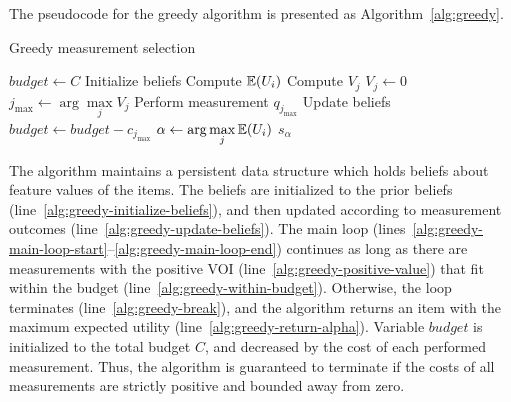 The pseudocode for the greedy algorithm is presented as Algorithm~\ref{alg:greedy}. 
\begin{algorithm}[t]
\caption{Greedy measurement selection}
\label{alg:greedy}
\begin{algorithmic}[1]
\State $budget \leftarrow C$
\State Initialize beliefs                             \label{alg:greedy-initialize-beliefs}
\Loop                                                 \label{alg:greedy-main-loop-start}
    \State Compute $\mathbb{E}(U_i)$
  \EndFor
                          \label{alg:greedy-voi-start}
                                \label{alg:greedy-within-budget}
      \State Compute $V_j$                            \label{alg:compute-voi}
    \Else
      \State $V_j \leftarrow 0$
    \EndIf
  \EndFor                                            \label{alg:greedy-voi-end}
  \State $j_{\max} \leftarrow \arg \max\limits_j V_j$  \label{alg:greedy-select}
                                  \label{alg:greedy-positive-value}
    \State Perform measurement $q_{j_{\max}}$           \label{alg:greedy-measure}
    \State Update beliefs                            \label{alg:greedy-update-beliefs}
    \State $budget \leftarrow  budget-c_{j_{\max}}$
  \EndIf
                                \label{alg:greedy-break}
\EndLoop                                            \label{alg:greedy-main-loop-end}
\State $\alpha \leftarrow \arg \max \limits_j \mathbb{E}(U_i)$
\Return $s_\alpha$                                   \label{alg:greedy-return-alpha}
\end{algorithmic}
\end{algorithm}
The algorithm maintains a persistent data
structure which holds beliefs about feature values of the items. The
beliefs are initialized to the prior beliefs
(line~\ref{alg:greedy-initialize-beliefs}), and then updated according
to measurement outcomes (line~\ref{alg:greedy-update-beliefs}). The
main loop
(lines~\ref{alg:greedy-main-loop-start}--\ref{alg:greedy-main-loop-end})
continues as long as there are measurements with the positive VOI
(line~\ref{alg:greedy-positive-value}) that fit within the budget
(line~\ref{alg:greedy-within-budget}). Otherwise, the loop terminates
(line~\ref{alg:greedy-break}), and the algorithm returns an item
with the maximum expected utility (line~\ref{alg:greedy-return-alpha}).
Variable $budget$ is initialized to the total budget $C$, and
decreased by the cost of each performed measurement. Thus, the
algorithm is guaranteed to terminate if the costs of all
measurements are strictly positive and bounded away from zero.

